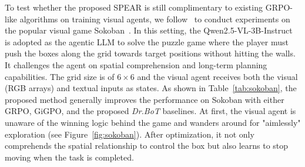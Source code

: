 \documentclass[]{youtu} %
\newcommand{\method}{\textsc{SPEAR}\xspace}
\begin{document}
To test whether the proposed \method is still complimentary to existing GRPO-like algorithms on training visual agents,
we follow~\cite{feng2025group} to conduct experiments on the popular visual game Sokoban~\cite{SchraderSokoban2018}.
In this setting,
the Qwen2.5-VL-3B-Instruct~\cite{bai2025qwen2} is adopted as the agentic LLM to solve the puzzle game where the player must push the boxes along the grid towards target positions without hitting the walls.
It challenges the agent on spatial comprehension and long-term planning capabilities.
The grid size is of $6\times6$ and the visual agent receives both the visual (RGB arrays) and textual inputs as states.
As shown in Table~\ref{tab:sokoban},
the proposed method generally improves the performance on Sokoban with either GRPO, GiGPO, and the proposed \textit{Dr.BoT} baselines.
At first,
the visual agent is unaware of the winning logic behind the game and wanders around for "aimlessly" exploration (see Figure~\ref{fig:sokoban}).
After optimization,
it not only comprehends the spatial relationship to control the box but also learns to stop moving when the task is completed.
\end{document}
